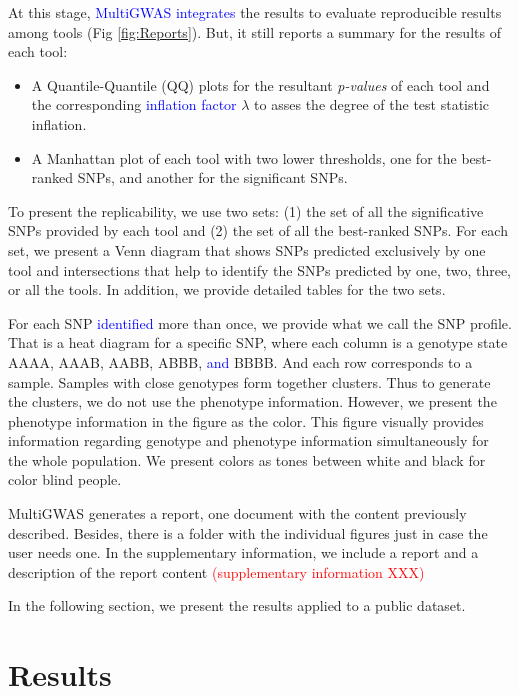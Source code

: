 \documentclass{article}
\begin{document}
At this stage, \textcolor{blue}{MultiGWAS integrates} the results to evaluate reproducible results among tools (Fig \ref{fig:Reports}). But, it still reports a summary for the results of each tool: 
\begin{itemize}
\item A Quantile-Quantile (QQ) plots for the resultant \emph{p-values} of each tool and the corresponding \textcolor{blue}{inflation factor} $\lambda$ to asses the degree of the test statistic inflation. 
\item A Manhattan plot of each tool with two lower thresholds, one for the best-ranked SNPs, and another for the significant SNPs. 
\end{itemize}
To present the replicability, we use two sets: (1) the set of all the significative SNPs provided by each tool and (2) the set of all the best-ranked SNPs. For each set, we present a Venn diagram that shows SNPs predicted exclusively by one tool and intersections that help to identify the SNPs predicted by one, two, three, or all the tools. In addition, we provide detailed tables for the two sets.

For each SNP \textcolor{blue}{identified} more than once, we provide what we call the SNP profile. That is a heat diagram for a specific SNP, where each column is a genotype state AAAA, AAAB, AABB, ABBB, \textcolor{blue}{and} BBBB. And each row corresponds to a sample. Samples with close genotypes form together clusters. Thus to generate the clusters, we do not use the phenotype information. However, we present the phenotype information in the figure as the color. This figure visually provides information regarding genotype and phenotype information simultaneously for the whole population. We present colors as tones between white and black for color blind people.

MultiGWAS generates a report, one document with the content previously described. Besides, there is a folder with the individual figures just in case the user needs one. In the supplementary information, we include a report and a description of the report content\textcolor{red}{{} (supplementary information XXX)}


In the following section, we present the results applied to a public dataset. 


\section{Results}
\end{document}
